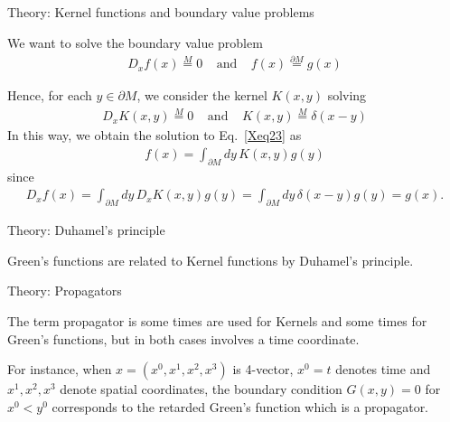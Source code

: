 \documentclass{beamer}
\begin{document}
\begin{frame}{Theory: Kernel functions and boundary value problems}

We want to solve the boundary value problem
\begin{eqnarray}
\label{Xeq23}
D_x f(x) 
\stackrel{M}{=}
0
\;\;\;\;
\mbox{and}
\;\;\;\;
f(x) 
\stackrel{\partial M}{=}
g(x)
\end{eqnarray}

Hence, for each $y\in \partial M$, we consider the kernel $K(x,y)$ solving
\begin{eqnarray}
\label{Xeq23}
D_x K(x,y) 
\stackrel{M}{=}
0
\;\;\;\;
\mbox{and}
\;\;\;\;
K(x,y) 
\stackrel{M}{=}
\delta(x-y)
\end{eqnarray}
In this way, we obtain the solution to Eq.~\ref{Xeq23} as
\begin{eqnarray}
f(x)
=
\int_{\partial M} dy\, 
K(x,y) 
g(y)
\end{eqnarray}
since
\begin{eqnarray}
D_x f(x)
=
\int_{\partial M} dy\, 
D_x K(x,y) 
g(y)
=
\int_{\partial M} dy\, 
\delta(x-y)
g(y)
=
g(x)
.
\end{eqnarray}

\end{frame}





\begin{frame}{Theory: Duhamel's principle}

Green's functions are related to Kernel functions by Duhamel's principle.

\vspace{.25cm}



\end{frame}


\begin{frame}{Theory: Propagators}

The term propagator is some times are used for Kernels and some times for Green's functions, but in both cases involves a time coordinate.

\vspace{.25cm}

For instance, when $x=(x^0,x^1,x^2,x^3)$ is 4-vector, $x^0=t$ denotes time and $x^1,x^2,x^3$ denote spatial coordinates, the boundary condition $G(x,y)=0$ for $x^0<y^0$ corresponds to the retarded Green's function which is a propagator.

\end{frame}
\end{document}
